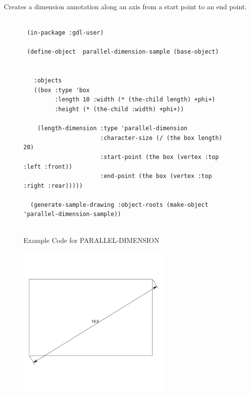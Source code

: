 \documentclass [11pt]{book}
\begin{document}
\begin{itemize}
\begin{description}
Creates a dimension annotation along an axis from a start point to an end point.



\end{description}




\begin{figure}
\begin{lrbox}{\boxedverb}
\begin{minipage}{\linewidth}
{\small

\begin{verbatim}        

 (in-package :gdl-user)
                   
 (define-object  parallel-dimension-sample (base-object)
  
  
   :objects
   ((box :type 'box
         :length 10 :width (* (the-child length) +phi+)
         :height (* (the-child :width) +phi+))
   
    (length-dimension :type 'parallel-dimension
                      :character-size (/ (the box length) 20)
                      :start-point (the box (vertex :top :left :front))
                      :end-point (the box (vertex :top :right :rear)))))

  (generate-sample-drawing :object-roots (make-object 'parallel-dimension-sample))


\end{verbatim}}
\end{minipage}
\end{lrbox}
\fbox{\usebox{\boxedverb}}

\caption{Example Code for PARALLEL-DIMENSION}

\label{fig:example-code-PARALLEL-DIMENSION}

\end{figure}

\begin{figure}
\begin{center}
\includegraphics[width=3in,height=3in]{../images/example-PARALLEL-DIMENSION.pdf}
\end{center}


\end{figure}
\end{itemize}
\end{document}
